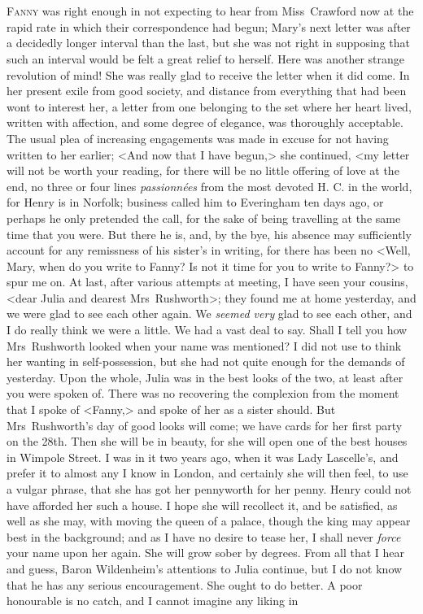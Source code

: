 \chapter[Chapter \thechapter]{} 

 \lettrine[lraise=0.3]{F}{anny} was right enough in not expecting to hear from Miss~Crawford now at the rapid rate in which their correspondence had begun; Mary's next letter was after a decidedly longer interval than the last, but she was not right in supposing that such an interval would be felt a great relief to herself. Here was another strange revolution of mind! She was really glad to receive the letter when it did come. In her present exile from good society, and distance from everything that had been wont to interest her, a letter from one belonging to the set where her heart lived, written with affection, and some degree of elegance, was thoroughly acceptable. The usual plea of increasing engagements was made in excuse for not having written to her earlier;  <And now that I have begun,> she continued,  <my letter will not be worth your reading, for there will be no little offering of love at the end, no three or four lines \textit{passionnées}  from the most devoted H. C. in the world, for Henry is in Norfolk; business called him to Everingham ten days ago, or perhaps he only pretended the call, for the sake of being travelling at the same time that you were. But there he is, and, by the bye, his absence may sufficiently account for any remissness of his sister's in writing, for there has been no 	<Well, Mary, when do you write to Fanny? Is not it time for you to write to Fanny?> to spur me on. At last, after various attempts at meeting, I have seen your cousins, 	<dear Julia and dearest Mrs~Rushworth>; they found me at home yesterday, and we were glad to see each other again. We \textit{seemed very}  glad to see each other, and I do really think we were a little. We had a vast deal to say. Shall I tell you how Mrs~Rushworth looked when your name was mentioned? I did not use to think her wanting in self-possession, but she had not quite enough for the demands of yesterday. Upon the whole, Julia was in the best looks of the two, at least after you were spoken of. There was no recovering the complexion from the moment that I spoke of 	<Fanny,> and spoke of her as a sister should. But Mrs~Rushworth's day of good looks will come; we have cards for her first party on the 28th. Then she will be in beauty, for she will open one of the best houses in Wimpole Street. I was in it two years ago, when it was Lady Lascelle's, and prefer it to almost any I know in London, and certainly she will then feel, to use a vulgar phrase, that she has got her pennyworth for her penny. Henry could not have afforded her such a house. I hope she will recollect it, and be satisfied, as well as she may, with moving the queen of a palace, though the king may appear best in the background; and as I have no desire to tease her, I shall never \textit{force}  your name upon her again. She will grow sober by degrees. From all that I hear and guess, Baron Wildenheim's attentions to Julia continue, but I do not know that he has any serious encouragement. She ought to do better. A poor honourable is no catch, and I cannot imagine any liking in 